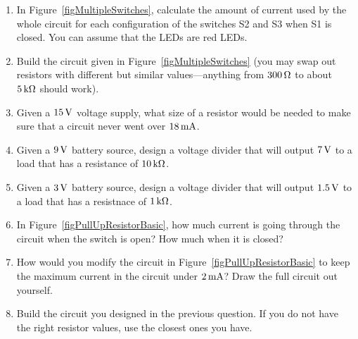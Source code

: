 \applysection

\begin{enumerate}
\item In Figure~\ref{figMultipleSwitches}, calculate the amount of current used by the whole circuit for each configuration of the switches S2 and S3 when S1 is closed.  You can assume that the LEDs are red LEDs.
\item Build the circuit given in Figure~\ref{figMultipleSwitches} (you may swap out resistors with different but similar values---anything from $300\,\si{\ohm}$ to about $5\,\si{\kilo\ohm}$ should work).
\item Given a $15\,\si{\volt}$ voltage supply, what size of a resistor would be needed to make sure that a circuit never went over $18\,\si{\milli\ampere}$.
\item Given a $9\,\si{\volt}$ battery source, design a voltage divider that will output $7\,\si{\volt}$ to a load that has a resistance of $10\,\si{\kilo\ohm}$.
\item Given a $3\,\si{\volt}$ battery source, design a voltage divider that will output $1.5\,\si{\volt}$ to a load that has a resistnace of $1\,\si{\kilo\ohm}$.
\item In Figure~\ref{figPullUpResistorBasic}, how much current is going through the circuit when the switch is open?  How much when it is closed?
\item How would you modify the circuit in Figure~\ref{figPullUpResistorBasic} to keep the maximum current in the circuit under $2\,\si{\milli\ampere}$?  Draw the full circuit out yourself.
\item Build the circuit you designed in the previous question.  If you do not have the right resistor values, use the closest ones you have.
\end{enumerate}

